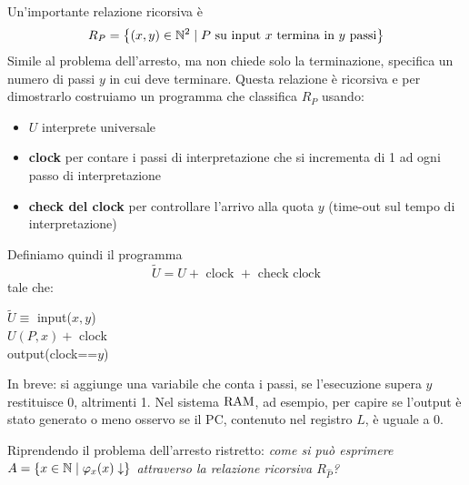 Un'importante relazione ricorsiva è
$$ R_P = \left\{(x,y) \in \mathbb{N}^2 \mid P \text{ su input } x \text{ termina in } y \text{ passi}\right\} $$
Simile al problema dell'arresto, ma non chiede solo la terminazione, specifica un numero di passi $y$ in cui deve terminare. Questa relazione è ricorsiva e per dimostrarlo costruiamo un programma che classifica $R_P$ usando:
\begin{itemize}
	\item $U$ interprete universale
	\item \textbf{clock} per contare i passi di interpretazione che si incrementa di 1 ad ogni passo di interpretazione
	\item \textbf{check del clock} per controllare l'arrivo alla quota $y$ (time-out sul tempo di interpretazione)
\end{itemize}

Definiamo quindi il programma
$$ \tilde U = U + \text{ clock } + \text{ check clock}$$
tale che:
\begin{center}
	\begin{minipage}{.85\textwidth}
		\begin{tcolorbox}[colback=white,sharp corners,boxrule=.3mm]
\begin{algorithm}[H]
    \SetAlgoNoEnd
    \SetInd{1em}{1em}

    $\tilde U \equiv$ input($x,y$) \\
    $U(P,x) + $ clock \\
    output(clock==$y$) \\
\end{algorithm}

		\end{tcolorbox}
	\end{minipage}
\end{center}

In breve: si aggiunge una variabile che conta i passi, se l'esecuzione supera $y$ restituisce 0, altrimenti 1. Nel sistema $\text{RAM}$, ad esempio, per capire se l'output è stato generato o meno osservo se il PC, contenuto nel registro $L$, è uguale a 0.

Riprendendo il problema dell'arresto ristretto: \textit{come si può esprimere $A = \left\{x \in \mathbb{N} \mid \varphi_x (x) \downarrow\right\}$ attraverso la relazione ricorsiva $R_{\hat{P}}$?}

